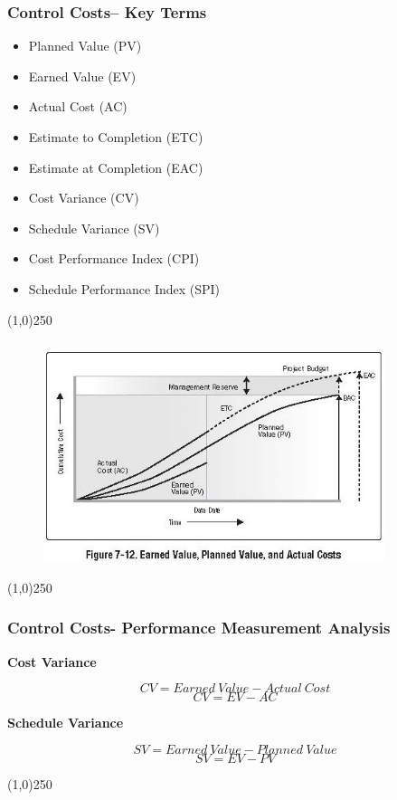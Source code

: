\begin{frame}
\frametitle{Control Costs– Key Terms}
\begin{itemize}
	\item Planned Value (PV)
	\item Earned Value (EV)
	\item Actual Cost (AC)
	\item Estimate to Completion (ETC)
	\item Estimate at Completion (EAC)
	\item Cost Variance (CV)
	\item Schedule Variance (SV)
	\item Cost Performance Index (CPI)
	\item Schedule Performance Index (SPI)
\end{itemize}
\end{frame}
\begin{center}\line(1,0){250}\end{center}






\begin{frame}
\frametitle{}
\begin{figure}
	\centering
		\includegraphics[width = 10cm]{images/Fig7-12.jpg}
	\label{fig:Fig7-12}
\end{figure}

\end{frame}
\begin{center}\line(1,0){250}\end{center}







\begin{frame}
\frametitle{Control Costs- Performance Measurement Analysis}
\textbf{Cost Variance}

\[
	CV = Earned \: Value - Actual\: Cost
\]
\[
	CV = EV - AC
\]

\textbf{Schedule Variance}

\[
	SV = Earned \:Value - Planned \:Value
\]
\[
	SV = EV - PV
\]

\end{frame}
\begin{center}\line(1,0){250}\end{center}






